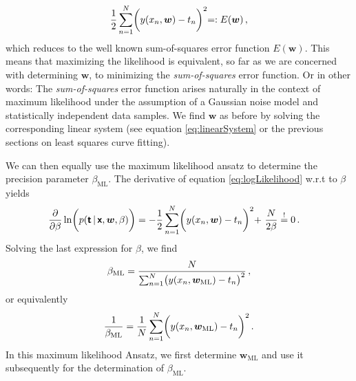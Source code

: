 \documentclass[11pt, DINA4, fleqn]{amsart}
\begin{document}
\begin{align}
\dfrac{1}{2} \sum\displaylimits_{n=1}^{N} \biggl(y(x_n, \bm{w}) - t_n\biggl)^2 =: E(\bm{w}) \, ,
\end{align}
which reduces to the well known sum-of-squares error function $E(\bm{w})$.
This means that maximizing the likelihood is equivalent, so far as we are concerned with determining $\bm{w}$, to minimizing the \emph{sum-of-squares} error function.
Or in other words: The \emph{sum-of-squares} error function arises naturally in the context of maximum likelihood under the assumption of a Gaussian noise model and statistically independent data samples. We find $\bm{w}$ as before by solving the corresponding linear system (see equation \eqref{eq:linearSystem} or the previous sections on least squares curve fitting).

We can then equally use the maximum likelihood ansatz to determine the precision parameter $\beta_{\text{ML}}$. The derivative of equation \eqref{eq:logLikelihood} w.r.t to $\beta$ yields
\begin{align}
\dfrac{\partial}{\partial \beta} \ln\biggl(p(\boldsymbol{\mathsf{t}} \, | \, \boldsymbol{\mathsf{x}}, \bm{w}, \beta)\biggl) &= -\dfrac{1}{2}\sum\displaylimits_{n=1}^{N} \biggl(y(x_n, \bm{w}) - t_n\biggl)^2
+\,\, \dfrac{N}{2\beta} \stackrel{!}{=} 0 \, .
\end{align}
Solving the last expression for $\beta$, we find
\begin{align}
\beta_{\text{ML}} = \dfrac{N}{\sum\displaylimits_{n=1}^{N} \bigl(y(x_n, \bm{w}_{\text{ML}}) - t_n\bigl)^2} \, ,
\end{align}
or equivalently
\begin{align}
\dfrac{1}{\beta_{\text{ML}}} = \dfrac{1}{N} \sum\displaylimits_{n=1}^{N} \biggl(y(x_n, \bm{w}_{\text{ML}}) - t_n\biggl)^2 \, .
\end{align}
In this maximum likelihood Ansatz, we first determine $\bm{w}_{\text{ML}}$ and use it subsequently for the determination of $\beta_{\text{ML}}$.
\end{document}
